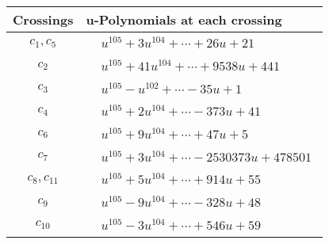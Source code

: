 \documentclass[1p]{elsarticle_modified}
\theoremstyle{definition}
\begin{document}
\begin{tabular}{m{50pt}|m{274pt}}
Crossings & \hspace{64pt}u-Polynomials at each crossing \\
\hline $$\begin{aligned}c_{1},c_{5}\end{aligned}$$&$\begin{aligned}
&u^{105}+3 u^{104}+\cdots+26 u+21
\end{aligned}$\\
\hline $$\begin{aligned}c_{2}\end{aligned}$$&$\begin{aligned}
&u^{105}+41 u^{104}+\cdots+9538 u+441
\end{aligned}$\\
\hline $$\begin{aligned}c_{3}\end{aligned}$$&$\begin{aligned}
&u^{105}- u^{102}+\cdots-35 u+1
\end{aligned}$\\
\hline $$\begin{aligned}c_{4}\end{aligned}$$&$\begin{aligned}
&u^{105}+2 u^{104}+\cdots-373 u+41
\end{aligned}$\\
\hline $$\begin{aligned}c_{6}\end{aligned}$$&$\begin{aligned}
&u^{105}+9 u^{104}+\cdots+47 u+5
\end{aligned}$\\
\hline $$\begin{aligned}c_{7}\end{aligned}$$&$\begin{aligned}
&u^{105}+3 u^{104}+\cdots-2530373 u+478501
\end{aligned}$\\
\hline $$\begin{aligned}c_{8},c_{11}\end{aligned}$$&$\begin{aligned}
&u^{105}+5 u^{104}+\cdots+914 u+55
\end{aligned}$\\
\hline $$\begin{aligned}c_{9}\end{aligned}$$&$\begin{aligned}
&u^{105}-9 u^{104}+\cdots-328 u+48
\end{aligned}$\\
\hline $$\begin{aligned}c_{10}\end{aligned}$$&$\begin{aligned}
&u^{105}-3 u^{104}+\cdots+546 u+59
\end{aligned}$\\
\hline
\end{tabular}\\~\\
\end{document}
